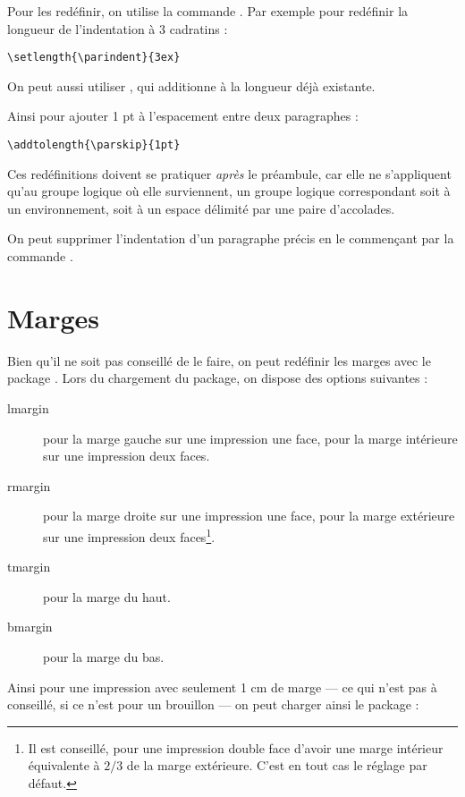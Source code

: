 Pour les redéfinir, on utilise la commande . Par exemple pour redéfinir la longueur de l'indentation à 3 cadratins :
\begin{verbatim}
\setlength{\parindent}{3ex}
\end{verbatim}

On peut aussi utiliser , qui additionne  à la longueur déjà existante.

Ainsi pour ajouter 1 pt à l'espacement entre deux paragraphes :

\begin{verbatim}
\addtolength{\parskip}{1pt}
\end{verbatim}

Ces redéfinitions doivent se pratiquer \emph{après} le préambule, car elle ne s'appliquent qu'au groupe logique où elle surviennent, un groupe logique correspondant soit à un environnement, soit à un espace délimité par une paire d'accolades.

\begin{plusloins}
On peut supprimer l'indentation d'un paragraphe précis en le commençant par la commande .
\end{plusloins}

\section{Marges}

Bien qu'il ne soit pas conseillé de le faire, on peut redéfinir les marges avec le package . Lors du chargement du package, on dispose des options suivantes :
\begin{description}
\item[lmargin]pour la marge gauche sur une impression une face, pour la marge intérieure sur une impression deux faces.
\item[rmargin]pour la marge droite sur une impression une face, pour la marge extérieure sur une impression deux faces\footnote{Il est conseillé, pour une impression double face d'avoir une marge intérieur équivalente à $2/3$ de la marge extérieure. C'est en tout cas le réglage par défaut.}.
\item[tmargin]pour la marge du haut.
\item[bmargin]pour la marge du bas.
\end{description}

Ainsi pour une impression avec seulement 1 cm de marge --- ce qui n'est pas à conseillé, si ce n'est pour un brouillon --- on peut charger ainsi le package :


